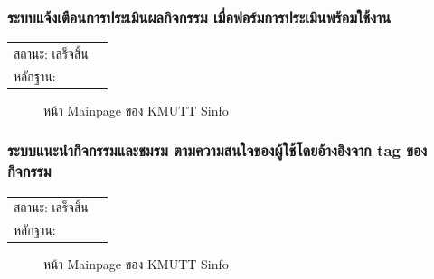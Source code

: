 \documentclass[14pt,oneside,openright,a4paper]{cpe-thai-project}
\begin{document}
\subsubsection{ระบบแจ้งเตือนการประเมินผลกิจกรรม เมื่อฟอร์มการประเมินพร้อมใช้งาน}
\begin{tabular}{@{}p{2cm}p{10cm}@{}}
  สถานะ: เสร็จสิ้น \\
  หลักฐาน: & \\
  \end{tabular}
\begin{figure}[!h]\centering
  \setlength{\fboxrule}{0.5mm} %
  \setlength{\fboxsep}{0.5cm}
  \caption{หน้า Mainpage ของ KMUTT Sinfo}\label{fig:sinfo}
\end{figure}
\newpage
\subsubsection{ระบบแนะนํากิจกรรมและชมรม ตามความสนใจของผู้ใช้โดยอ้างอิงจาก tag ของกิจกรรม}
\begin{tabular}{@{}p{2cm}p{10cm}@{}}
  สถานะ: เสร็จสิ้น \\
  หลักฐาน: & \\
\end{tabular}
\begin{figure}[!h]\centering
  \setlength{\fboxrule}{0.5mm} %
  \setlength{\fboxsep}{0.5cm}
  \caption{หน้า Mainpage ของ KMUTT Sinfo}\label{fig:sinfo}
\end{figure}
\newpage
\end{document}
